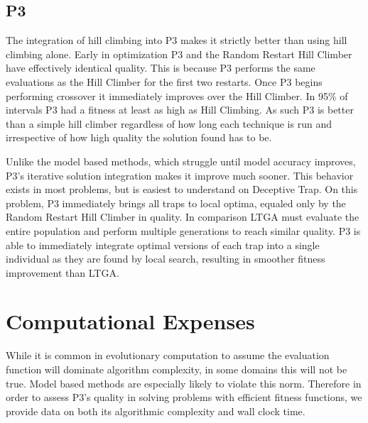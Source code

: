 \documentclass[twoside]{article}
\begin{document}
\subsection{P3}
The integration of hill climbing into P3 makes it strictly better than using hill climbing alone.
Early in optimization P3 and the Random Restart Hill Climber have effectively identical quality. This is because
P3 performs the same evaluations as the Hill Climber for the first two restarts. Once P3 begins
performing crossover it immediately improves over the Hill Climber. In 95\% of intervals P3 had a fitness at
least as high as Hill Climbing. As such P3 is better than a simple
hill climber regardless of how long each technique is run and irrespective of how high quality the solution
found has to be.

Unlike the model based methods, which struggle until model accuracy improves, P3's iterative solution
integration makes it improve much sooner. This behavior exists in most problems, but is easiest to understand on Deceptive Trap.
On this problem, P3 immediately brings all traps to local optima, equaled only by the Random Restart Hill Climber in quality.
In comparison LTGA must evaluate the entire population and perform multiple generations to reach similar quality.
P3 is able to immediately integrate optimal versions of each
trap into a single individual as they are found by local search, resulting in smoother fitness improvement than LTGA.

\section{Computational Expenses}
While it is common in evolutionary computation to assume the evaluation function will dominate algorithm
complexity, in some domains this will not be true. Model based methods are especially likely to violate
this norm. Therefore in order to assess P3's quality in solving problems with efficient fitness functions,
we provide data on both its algorithmic complexity and wall clock time.
\end{document}
